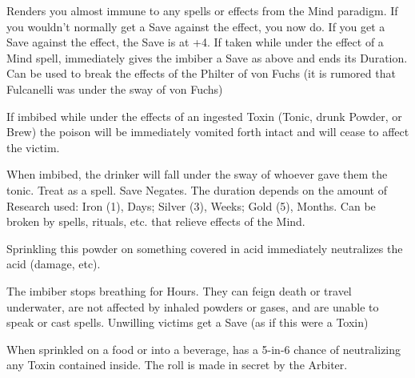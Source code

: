 {Renders you almost immune to any spells or effects from the Mind paradigm.  If you wouldn't normally get a Save against the effect, you now do.  If you  get a Save against the effect, the Save is at +4.  If taken while under the effect of a Mind spell, immediately gives the imbiber a Save as above and ends its Duration.  Can be used to break the effects of the Philter of von Fuchs (it is rumored that Fulcanelli was under the sway of von Fuchs)

\CHYMISTRY[
  Name=Liebnitz Purgation,
  Link=chymistry-liebnitz-purgation,
  Cost=Silver (3),
  Duration=0 ,
  Toxin=No,
  Narcotic=No 
]

If imbibed while under the effects of an ingested Toxin (Tonic, drunk Powder, or Brew) the poison will be immediately vomited forth intact and will cease to affect the victim.  

\CHYMISTRY[
  Name=Philter of von Fuchs,
  Link=chymistry-philter-von-Fuchs,
  Cost=See Below,
  Duration=See Below,
  Toxin=Yes,
  Narcotic=No 
]

When imbibed, the drinker will fall under the sway of whoever gave them the tonic.  Treat as a  spell.  Save Negates.  The duration depends on the amount of Research used:  Iron (1), Days; Silver (3), Weeks; Gold (5), Months.  Can be broken by spells, rituals, etc. that relieve effects of the Mind.


  \CHYMISTRY[
    Name=Dastin's Basic Talc,
    Link=chymistry-dastins-basic-talc,
    Cost=Iron (1),
    Duration=0 ,
    Toxin=No,
    Narcotic=No 
  ]


  Sprinkling this powder on something covered in acid immediately neutralizes the acid (damage, etc).


  \CHYMISTRY[
    Name=Mermaid's Kiss,
    Link=chymistry-mermaids-kiss,
    Cost=Silver (3),
    Duration=0 ,
    Toxin=Yes,
    Narcotic=No 
  ]


  The imbiber stops breathing for Hours.  They can feign death or travel underwater, are not affected by inhaled powders or gases, and are unable to speak or cast spells.  Unwilling victims get a Save (as if this were a Toxin)



  \CHYMISTRY[
    Name=Powdered Bezoar,
    Link=chymistry-powdered-bezoar,
    Cost=Iron (1),
    Duration=0 ,
    Toxin=No,
    Narcotic=No 
  ]


  When sprinkled on a food or into a beverage, has a 5-in-6 chance of neutralizing any Toxin contained inside.  The roll is made in secret by the Arbiter.


}
